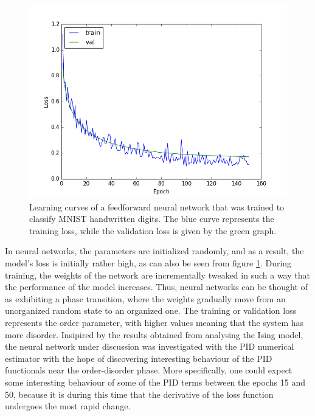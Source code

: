 \documentclass[12pt]{article}
\begin{document}
\begin{figure} [h]
\begin{center}
\includegraphics[width=.9\textwidth]{neural-net-loss}
\caption{Learning curves of a feedforward neural network that was trained to classify MNIST handwritten digits. The blue curve represents the training loss, while the validation loss is given by the green graph.}
\label{fig:neural-net-loss}
\end{center}
\end{figure}

In neural networks, the parameters are initialized randomly, and as a result, the model's loss is initially rather high, as can also be seen from figure \ref{fig:neural-net-loss}. During training, the weights of the network are incrementally tweaked in such a way that the performance of the model increases. Thus, neural networks can be thought of as exhibiting a phase transition, where the weights gradually move from an unorganized random state to an organized one. The training or validation loss represents the order parameter, with higher values meaning that the system has more disorder. Insipired by the results obtained from analysing the Ising model, the neural network under discussion was investigated with the PID numerical estimator with the hope of discovering interesting behaviour of the PID functionals near the order-disorder phase. More specifically, one could expect some interesting behaviour of some of the PID terms between the epochs 15 and 50, because it is during this time that the derivative of the loss function undergoes the most rapid change.
\end{document}

